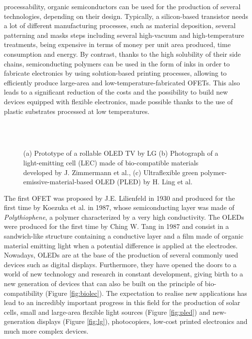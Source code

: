 \documentclass  [
  paper    = a4,
  BCOR     = 10mm,
  twoside,
  fontsize = 12pt,
  fleqn,
  toc      = bibnumbered,
  toc      = listofnumbered,
  numbers  = noendperiod,
  headings = normal,
  listof   = leveldown,
  version  = 3.03
]                                       {scrreprt}
\begin{document}
processability, organic semiconductors can be used for the production of several technologies, depending on their design. Typically, a silicon-based transistor needs a lot of different manufacturing processes, such as material deposition, several patterning and masks steps including several high-vacuum and high-temperature treatments, being expensive in terms of money per unit area produced, time consumption and energy. By contrast, thanks to the high solubility of their side chains, semiconducting polymers can be used in the form of inks in order to fabricate electronics by using solution-based printing processes, allowing to efficiently produce large-area and low-temperature-fabricated OFETs. This also leads to a significant reduction of the costs and the possibility to build new devices equipped with flexible electronics, made possible thanks to the use of plastic substrates processed at low temperatures\cite{book:koehler}. 
\begin{figure}[t]
	\centering%
	\\
	\qquad
	\\
	\caption{\footnotesize (a) Prototype of a rollable OLED TV by LG \cite{web:LGrollable} (b) Photograph of a light-emitting cell (LEC) made of bio-compatible materials developed by J. Zimmermann et al.\cite{art:biolec}, (c) Ultraflexible green polymer-emissive-material-based OLED (PLED) by H. Ling et al.\cite{art:pled}}
	\label{fig:applications}
\end{figure}
The first OFET was proposed by J.E. Lilienfeld\cite{pat:lilienfeld} in 1930 and produced for the first time by Koezuka et al.\cite{art:koezuka} in 1987, whose semiconducting layer was made of \emph{Polythiophene}, a polymer characterized by a very high conductivity. The OLEDs were produced for the first time by Ching W. Tang in 1987\cite{art:ching} and consist in a sandwich-like structure containing a conductive layer and a film made of organic material emitting light when a potential difference is applied at the electrodes. Nowadays, OLEDs are at the base of the production of several commonly used devices such as digital displays. Furthermore, they have opened the doors to a world of new technology and research in constant development, giving birth to a new generation of devices that can also be built on the principle of bio-compatibility (Figure \ref{fig:biolec}). The expectation to realise new applications has lead to an incredibly important progress in this field for the production of solar cells, small and large-area flexible light sources (Figure \ref{fig:pled}) and new-generation displays (Figure \ref{fig:lg}), photocopiers, low-cost printed electronics and much more complex devices.\\
\end{document}
